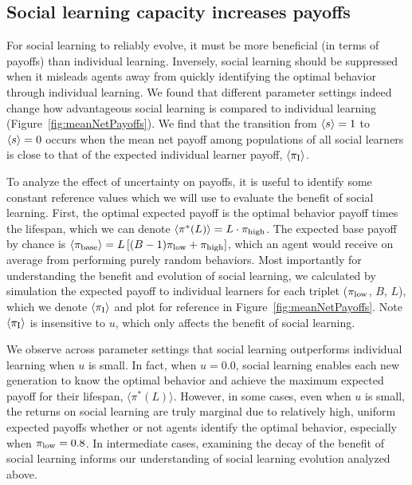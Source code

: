 \documentclass[letterpaper,11.5pt]{scrartcl}
\begin{document}
\subsection{Social learning capacity increases payoffs}

For social learning to reliably evolve, it must be more beneficial
(in terms of payoffs) than individual learning. Inversely, social learning
should be suppressed when it misleads agents away from quickly identifying the
optimal behavior through individual learning.
We found that different parameter settings indeed change how 
advantageous social learning
is compared to individual learning (Figure~\ref{fig:meanNetPayoffs}).
We find that the transition from $\langle s \rangle = 1$ to $\langle s \rangle = 0$ occurs when
the mean net payoff among populations of all social learners is close to 
that of the expected individual learner payoff, $\langle \pi_{\mathrm{I}} \rangle$.

To analyze the effect of uncertainty on
payoffs, it is useful to identify some constant reference values which we will
use to evaluate the benefit of social learning. First, the optimal expected payoff
is the optimal behavior payoff times the lifespan, which we can denote
$\langle \pi^*(L) \rangle = L\cdot\pi_{\mathrm{high}}$. The expected base payoff by chance is 
$\langle \pi_{\text{base}} \rangle = L \left[ (B - 1) \pi_{\mathrm{low}} + \pi_{\mathrm{high}} \right]$, which
an agent would receive on average from performing purely random behaviors. 
Most importantly for understanding the benefit and evolution of social learning,
we calculated by simulation the expected payoff to individual learners for
each triplet ($\pi_{\mathrm{low}}$, $B$, $L$), which we denote $\langle \pi_{\mathrm{I}} \rangle$
and plot for reference in Figure~\ref{fig:meanNetPayoffs}. Note 
$\langle \pi_{\mathrm{I}} \rangle$ is insensitive to $u$, which only affects the benefit of social
learning.

We observe across parameter settings that social learning outperforms
individual learning when $u$ is small. In fact, when $u=0.0$, social learning
enables each new generation to know the optimal behavior and achieve the
maximum expected payoff for their lifespan, $\langle \pi^*(L) \rangle$.
However, in some cases, even when $u$ is small, the returns on social learning
are truly marginal due to relatively high, uniform expected payoffs whether or
not agents identify the optimal behavior, especially when $\pi_{\mathrm{low}} = 0.8$. In
intermediate cases, examining the decay of the benefit of social learning
informs our understanding of social learning evolution analyzed above.  
\end{document}
